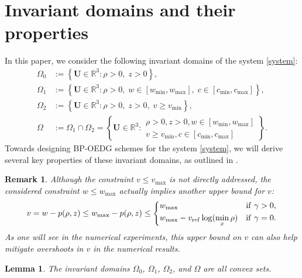 \documentclass[times,final]{elsarticle}
\newtheorem{lemma}[theorem]{Lemma}
\newtheorem{remark}{Remark}[section]
\numberwithin{equation}{section}
\theoremstyle{definition}
\theoremstyle{remark}
\newcommand{\BU}{\mathbf{U}}
\begin{document}
\begin{figure}[omitted: a diagram of this paper's results, not reproduced here]\label{fig:314}\end{figure}


\section{Invariant domains and their properties}\label{sec:inv}
In this paper, we consider the following invariant domains of the system \eqref{system}:
\begin{align}
	\Omega_0 &:= \left\{ \BU  \in \mathbb{R}^3 : \rho > 0, \; z > 0 \right\}, \nonumber \\
	\Omega_1 &:= \left\{ \BU  \in \mathbb{R}^3 : \rho > 0, \; w \in [w_{\min}, w_{\max}], \; c \in [c_{\min}, c_{\max}] \right\}, 
	\nonumber \\
	\Omega_2 &:= \left\{ \BU  \in \mathbb{R}^3 : \rho > 0, \; z > 0, \; v \geq v_{\min} \right\}, \label{eq:O2} \\
	\Omega   &:= \Omega_1 \cap \Omega_2
	= 
	\left\{
	\BU  \in \mathbb{R}^3
	:
	\begin{array}{r}
		\rho > 0, z > 0, w \in \left[ w_{\min}, w_{\max} \right] \\
		v \ge v_{\min},	c \in \left[ c_{\min}, c_{\max} \right]
	\end{array}
	\right\}.  \label{eq:270}
\end{align}
Towards designing BP-OEDG schemes for the system \eqref{system}, we will derive several key properties of these invariant domains, as outlined in .

\begin{remark}\label{rmk:435}
	Although the constraint $v \le v_{\max}$ is not directly addressed, the considered constraint $w \le w_{\max}$ actually implies another upper bound for $v$:
	\[
	v = w-p(\rho,z) \le w_{\max} - p(\rho,z)
	\le
	\begin{dcases}
		w_{\max} 
		& 
		{\rm if }~ \gamma > 0,
		\\
		w_{\max} - v_{\rm ref} \log (\min_x \rho)
		& {\rm if }~ \gamma = 0.
	\end{dcases}
	\]
	As one will see in the numerical experiments, this upper bound on $v$ can also help mitigate overshoots in $v$ in the numerical results. 
\end{remark}

\begin{lemma}\label{lem:466}
	The invariant domains $\Omega_0$, $\Omega_1$, $\Omega_2$, and $\Omega$ are all convex sets.
\end{lemma}
\end{document}
